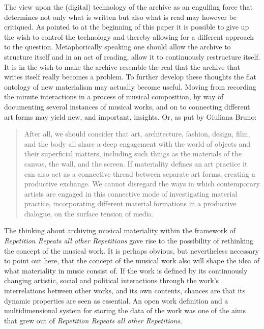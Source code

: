 \documentclass[11pt,a4paper]{article}
\begin{document}
The view upon the (digital) technology of the archive as an engulfing force that determines not only what is written but also what is read may however be critiqued. As pointed to at the beginning of this paper it is possible to give up the wish to control the technology and thereby allowing for a different approach to the question. Metaphorically speaking one should allow the archive to structure itself and in an act of reading, allow it to continuously restructure itself. It is in the wish to make the archive resemble the real that the archive that writes itself really becomes a problem. To further develop these thoughts the flat ontology of new materialism may actually become useful. Moving from recording the minute interactions in a process of musical composition, by way of documenting several instances of musical works, and on to connecting different art forms may yield new, and important, insights. Or, as put by Giuliana Bruno:

\begin{quote}
  After all, we should consider that art, architecture, fashion, design, film, and the body all share a deep engagement with the world of objects and their superficial matters, including such things as the materials of the canvas, the wall, and the screen. If materiality defines an art practice it can also act as a connective thread between separate art forms, creating a productive exchange. We cannot disregard the ways in which contemporary artists are engaged in this connective mode of investigating material practice, incorporating different material formations in a productive dialogue, on the surface tension of media. \citep[p. 15]{joselit2016}
\end{quote}

The thinking about archiving musical materiality within the framework of \emph{Repetition Repeats all other Repetitions} gave rise to the possibility of rethinking the concept of the musical work. It is perhaps obvious, but nevertheless necessary to point out here, that the concept of the musical work also will shape the idea of what materiality in music consist of. If the work is defined by its continuously changing artistic, social and political interactions through the work's interrelations between other works, and its own contents, chances are that its dynamic properties are seen as essential. An open work definition and a multidimensional system for storing the data of the work was one of the aims that grew out of \emph{Repetition Repeats all other Repetitions}.
\end{document}
